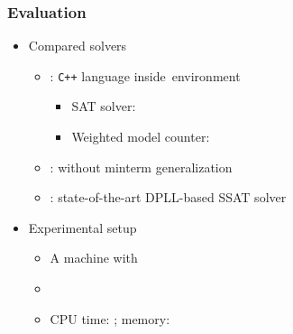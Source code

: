 \newcommand{\nrandom}{\num{700}}
\newcommand{\napplication}{\num{120}}
\newcommand{\nstrategic}{\num{60}}
\newcommand{\npec}{\num{60}}

\begin{frame}
    \frametitle{Evaluation}
    \begin{itemize}
        \item Compared solvers
              \begin{itemize}
                  \item \ressat: \texttt{C++} language inside~\abc environment~\cite{ABC}
                        \begin{itemize}
                            \item SAT solver: ~\cite{Een2003Solver}
                            \item Weighted model counter: \cachet~\cite{Sang2004}
                        \end{itemize}
                  \item \ressatb: \ressat without minterm generalization
                  \item \dcssat: state-of-the-art DPLL-based SSAT solver
              \end{itemize}
              \pause
        \item Experimental setup
              \begin{itemize}
                  \item A machine with~\machineSpec
                  \item \osInfo
                  \item CPU time: \timelimit; memory: \memlimit
              \end{itemize}
    \end{itemize}
\end{frame}

